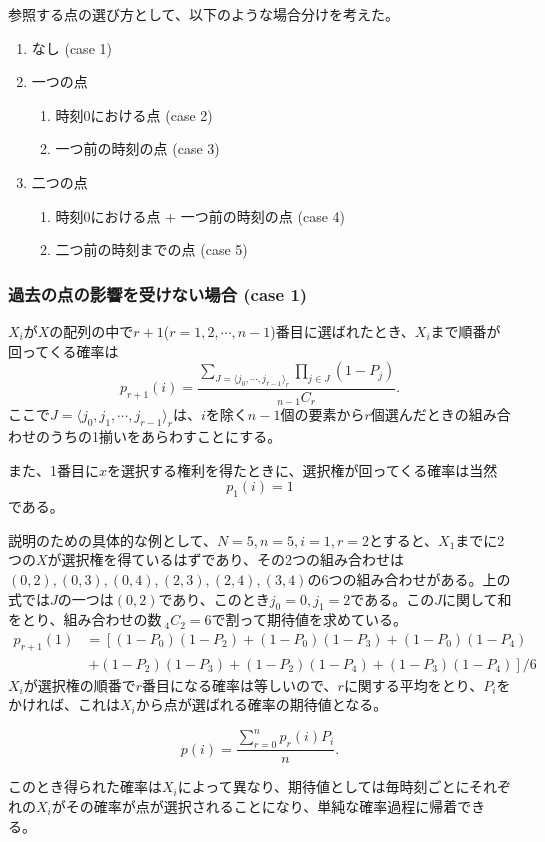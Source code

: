 参照する点の選び方として、以下のような場合分けを考えた。

\begin{enumerate}
    \item なし (case 1)
    \item 一つの点
    \begin{enumerate}
        \item 時刻0における点 (case 2)
        \item 一つ前の時刻の点 (case 3)
        \end{enumerate}
    \item 二つの点
    \begin{enumerate}
        \item 時刻0における点 + 一つ前の時刻の点 (case 4)
        \item 二つ前の時刻までの点 (case 5)
        \end{enumerate}
\end{enumerate}

\subsubsection{過去の点の影響を受けない場合 (case 1)}

$X_{i}$が$X$の配列の中で$r+1$($r = 1, 2, \cdots , n-1$)番目に選ばれたとき、$X_{i}$まで順番が回ってくる確率は
\[p_{r+1}(i) = \frac{\sum_{J = \langle j_{0}, \cdots ,j_{r-1} \rangle _{r}}\prod_{j\in J}(1-P_{j})}{_{n-1}C_{r}}.\]
ここで$J = \langle j_{0}, j_{1}, \cdots ,j_{r-1} \rangle_{r}$は、$i$を除く$n-1$個の要素から$r$個選んだときの組み合わせのうちの1揃いをあらわすことにする。

また、1番目に$x$を選択する権利を得たときに、選択権が回ってくる確率は当然
\[p_{1}(i) = 1\]
である。

説明のための具体的な例として、$N = 5, n = 5, i = 1, r = 2$とすると、$X_{1}$までに2つの$X$が選択権を得ているはずであり、その2つの組み合わせは$(0,2), (0,3), (0,4), (2,3), (2,4), (3,4)$の6つの組み合わせがある。上の式では$J$の一つは$(0, 2)$であり、このとき$j_{0} = 0, j_{1} = 2$である。この$J$に関して和をとり、組み合わせの数$\ _{4}C_{2} = 6$で割って期待値を求めている。
\begin{align}
p_{r+1}(1) &= \left[(1-P_{0})(1-P_{2}) + (1-P_{0})(1-P_{3}) + (1-P_{0})(1-P_{4}) \right. \nonumber \\
&\ \left. + (1-P_{2})(1-P_{3}) + (1-P_{2})(1-P_{4}) + (1-P_{3})(1-P_{4}) \right]/6
\end{align}
$X_{i}$が選択権の順番で$r$番目になる確率は等しいので、$r$に関する平均をとり、$P_{i}$をかければ、これは$X_{i}$から点が選ばれる確率の期待値となる。

\[p(i) = \frac{\sum_{r=0}^{n}p_{r}(i)P_{i}}{n}.\]

このとき得られた確率は$X_{i}$によって異なり、期待値としては毎時刻ごとにそれぞれの$X_{i}$がその確率が点が選択されることになり、単純な確率過程に帰着できる。

